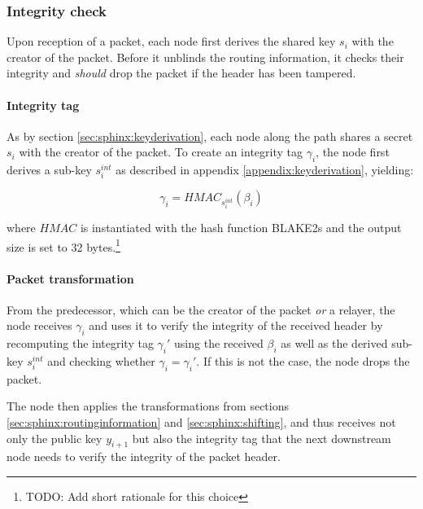 \subsubsection{Integrity check}
\label{sec:sphinx:integrity}

Upon reception of a packet, each node first derives the shared key $s_i$ with the creator of the packet. Before it unblinds the routing information, it checks their integrity and \textit{should} drop the packet if the header has been tampered.

\paragraph{Integrity tag}

As by section \ref{sec:sphinx:keyderivation}, each node along the path shares a secret $s_i$ with the creator of the packet. To create an integrity tag $\gamma_i$, the node first derives a sub-key $s_i^{int}$ as described in appendix \ref{appendix:keyderivation}, yielding:

$$\gamma_i = HMAC_{s_i^{int}}(\beta_i)$$

where $HMAC$ is instantiated with the hash function \textsf{BLAKE2s} and the output size is set to 32 bytes.\footnote{TODO: Add short rationale for this choice}

\paragraph{Packet transformation}

From the predecessor, which can be the creator of the packet \textit{or} a relayer, the node receives $\gamma_i$ and uses it to verify the integrity of the received header by recomputing the integrity tag $\gamma_i'$ using the received $\beta_i$ as well as the derived sub-key $s_i^{int}$ and checking whether $\gamma_i = \gamma_i'$. If this is not the case, the node drops the packet.

The node then applies the transformations from sections \ref{sec:sphinx:routinginformation} and \ref{sec:sphinx:shifting}, and thus receives not only the public key $y_{i+1}$ but also the integrity tag that the next downstream node needs to verify the integrity of the packet header.

